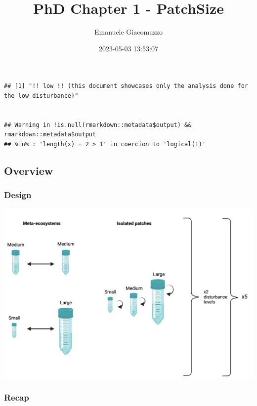 \documentclass[
]{article}
\title{PhD Chapter 1 - PatchSize}
\author{Emanuele Giacomuzzo}
\date{2023-05-03 13:53:07}
\begin{document}
\maketitle

\begin{verbatim}
## [1] "!! low !! (this document showcases only the analysis done for the low disturbance)"
\end{verbatim}

\hypertarget{section}{%
\section{}\label{section}}

\begin{verbatim}
## Warning in !is.null(rmarkdown::metadata$output) && rmarkdown::metadata$output
## %in% : 'length(x) = 2 > 1' in coercion to 'logical(1)'
\end{verbatim}

\hypertarget{overview}{%
\subsection{Overview}\label{overview}}

\hypertarget{design}{%
\subsubsection{Design}\label{design}}

\includegraphics{images/Design.png}

\hypertarget{recap}{%
\subsubsection{Recap}\label{recap}}
\end{document}
